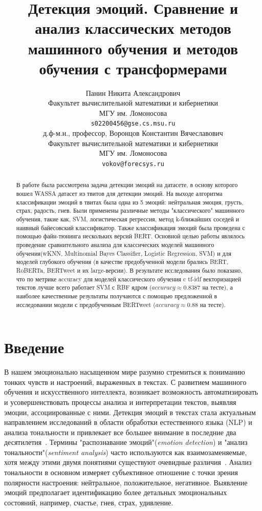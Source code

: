 \documentclass{article}
\title{Детекция эмоций. Сравнение и анализ классических методов машинного обучения и методов обучения с трансформерами}
\author{ Панин Никита Александрович \\
        Факультет вычислительной математики и кибернетики \\
        МГУ им. Ломоносова \\
        \texttt{s02200456@gse.cs.msu.ru} \\
	\And
	д.ф-м.н., профессор, Воронцов Константин Вячеславович \\
        Факультет вычислительной математики и кибернетики \\
        МГУ им. Ломоносова \\
        \texttt{vokov@forecsys.ru} \\
}
\date{}
\begin{document}
\maketitle

\begin{abstract}
	В работе была рассмотрена задача детекции эмоций на датасете, в основу которого вошел WASSA датасет из твитов для детекции эмоций. На выходе алгоритма классификации эмоций в твитах была одна из 5 эмоций: нейтральная эмоция, грусть, страх, радость, гнев. Были применены различные методы "классического" машинного обучения, такие как, SVM, логистическая регрессия, метод k-ближайших соседей и наивный байесовский классификатор. Также классификация эмоций была проведена с помощью файн-тюнинга нескольких версий BERT. Основной целью работы являлось проведение сравнительного анализа для классических моделей машинного обучения(wKNN, Multinomial Bayes Classifier, Logistic Regression, SVM) и для моделей глубокого обучения (в качестве предобученной модели брались BERT, RoBERTa, BERTweet и их large-версии). В результате исследования было показано, что по метрике accuracy для моделей классического обучения c tf-idf векторизацией текстов лучше всего работает SVM с RBF ядром ($accuracy \approx 0.8387$ на тесте), а наиболее качественные результаты получаются с помощью предложенной в исследовании модели с предобученным BERTweet ($accuracy \approx 0.88$ на тесте).
\end{abstract}



\section{Введение}
В нашем эмоционально насыщенном мире разумно стремиться к пониманию тонких чувств и настроений, выраженных в текстах. С развитием машинного обучения и искусственного интеллекта, возникает возможность автоматизировать и усовершенствовать процессы анализа и интерпретации текстов, выявляя эмоции, ассоциированные с ними. Детекция эмоций в текстах стала актуальным направлением исследований в области обработки естественного языка (NLP) и анализа тональности и привлекает все большее внимание в последние два десятилетия~\cite{affectdetectionintexts, jiawenfuji}. Термины "распознавание эмоций"({\itshape{emotion detection}}) и  "анализ тональности"({\itshape{sentiment analysis}}) часто используются как взаимозаменяемые, хотя между этими двумя понятиями существуют очевидные различия~\cite{yadollahi}. Анализ тональности в основном измеряет субъективное отношение с точки зрения полярности настроения: нейтральное, положительное, негативное. Выявление эмоций предполагает идентификацию более детальных эмоциональных состояний, например,  счастье, гнев, страх, удивление. 
\end{document}
